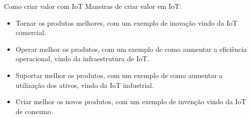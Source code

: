 
\begin{frame}{Como criar valor com IoT}
    Maneiras de criar valor em IoT:
    \begin{itemize}
        \item Tornar os produtos melhores, com um exemplo de inovação vindo da IoT comercial.
        \item Operar melhor os produtos, com um exemplo de como aumentar a eficiência operacional, vindo da infraestrutura de IoT.
        \item Suportar melhor os produtos, com um exemplo de como aumentar a utilização dos ativos, vindo da IoT industrial.
        \item Criar melhor os novos produtos, com um exemplo de invenção vindo da IoT de consumo.
    \end{itemize}
\end{frame}
